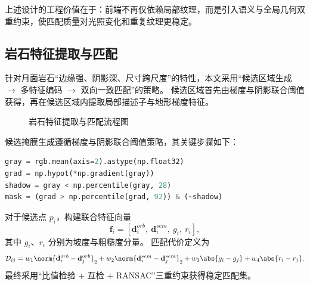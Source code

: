 上述设计的工程价值在于：前端不再仅依赖局部纹理，而是引入语义与全局几何双重约束，使匹配质量对光照变化和重复纹理更稳定。

\subsection{岩石特征提取与匹配}
\label{subsec:ch5_rock_feature_matching}

针对月面岩石“边缘强、阴影深、尺寸跨尺度”的特性，本文采用“候选区域生成 $\rightarrow$ 多特征编码 $\rightarrow$ 双向一致匹配”的策略。
候选区域首先由梯度与阴影联合阈值获得，再在候选区域内提取局部描述子与地形梯度特征。

\begin{figure}[H]
	\centering
	\caption{岩石特征提取与匹配流程图}
	\label{fig:ch5_feature_matching_flow}
\end{figure}

候选掩膜生成遵循梯度与阴影联合阈值策略，其关键步骤如下：
\begin{lstlisting}[language=Python,caption={岩石候选区域提取关键代码片段},label={lst:ch5_rock_mask_code}]
gray = rgb.mean(axis=2).astype(np.float32)
grad = np.hypot(*np.gradient(gray))
shadow = gray < np.percentile(gray, 28)
mask = (grad > np.percentile(grad, 92)) & (~shadow)
\end{lstlisting}

对于候选点 $p_i$，构建联合特征向量
\begin{equation}
\mathbf{f}_i=[\mathbf{d}^{orb}_i,\ \mathbf{d}^{sem}_i,\ g_i,\ r_i],
\label{eq:ch5_joint_feature}
\end{equation}
其中 $g_i$、$r_i$ 分别为坡度与粗糙度分量。
匹配代价定义为
\begin{equation}
\mathcal{D}_{ij}=w_1\norm{\mathbf{d}^{orb}_i-\mathbf{d}^{orb}_j}_2
+w_2\norm{\mathbf{d}^{sem}_i-\mathbf{d}^{sem}_j}_2
+w_3\abs{g_i-g_j}+w_4\abs{r_i-r_j}.
\label{eq:ch5_match_distance}
\end{equation}
最终采用“比值检验 + 互检 + RANSAC”三重约束获得稳定匹配集。

